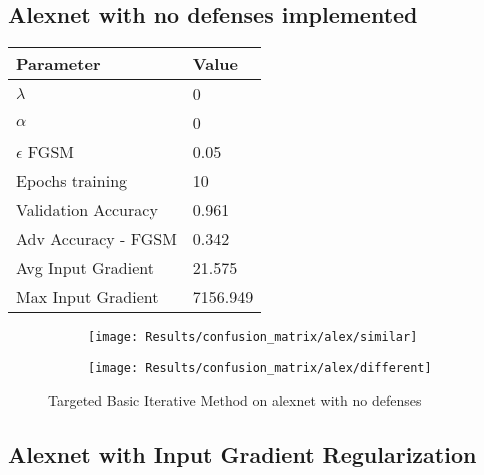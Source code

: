 \documentclass[draft,final]{vutinfth} %
\begin{document}
\subsection{Alexnet with no defenses implemented}

\begin{table}[h]
  \centering
  \begin{tabular}{ll}
    \toprule
			Parameter			& Value   \\
    \midrule
			$\lambda$								& 0				\\
			$\alpha$								& 0				\\
			$\epsilon$ FGSM					& 0.05		\\
			Epochs training					& 10			\\
			
			Validation Accuracy			& 0.961		\\
			Adv Accuracy - FGSM			& 0.342		\\
			
			Avg Input Gradient			& 21.575	\\
			Max Input Gradient			& 7156.949\\
    \bottomrule
  \end{tabular}
\end{table}


\begin{figure}[h]
  \begin{subfigure}[b]{0.5\columnwidth}
		\centering
    \texttt{[image: Results/confusion\_matrix/alex/similar]}%
    \label{fig:exp:cm:alex:similar}
  \end{subfigure}
  \begin{subfigure}[b]{0.5\columnwidth}
		\centering
    \texttt{[image: Results/confusion\_matrix/alex/different]}
    \label{fig:exp:cm:alex:different}
  \end{subfigure}
  \caption{Targeted Basic Iterative Method on alexnet with no defenses}
	\label{fig:exp:cm:alex}
\end{figure}
\clearpage

\subsection{Alexnet with Input Gradient Regularization}
\end{document}
